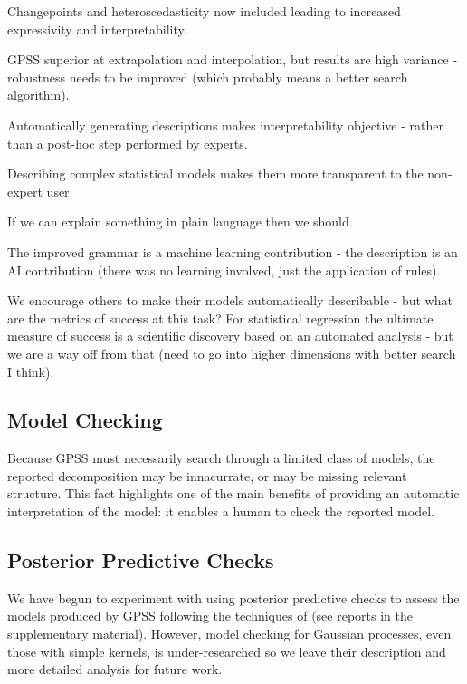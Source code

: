 \documentclass{article}
\begin{document}
Changepoints and heteroscedasticity now included leading to increased expressivity and interpretability.

GPSS superior at extrapolation and interpolation, but results are high variance - robustness needs to be improved (which probably means a better search algorithm).

Automatically generating descriptions makes interpretability objective - rather than a post-hoc step performed by experts.

Describing complex statistical models makes them more transparent to the non-expert user.

If we can explain something in plain language then we should.

The improved grammar is a machine learning contribution - the description is an AI contribution (there was no learning involved, just the application of rules).

We encourage others to make their models automatically describable - but what are the metrics of success at this task?
For statistical regression the ultimate measure of success is a scientific discovery based on an automated analysis - but we are a way off from that (need to go into higher dimensions with better search I think).

\subsection{Model Checking}

Because GPSS must necessarily search through a limited class of models, the reported decomposition may be innacurrate, or may be missing relevant structure.  This fact highlights one of the main benefits of providing an automatic interpretation of the model: it enables a human to check the reported model.

\subsection{Posterior Predictive Checks}

We have begun to experiment with using posterior predictive checks to assess the models produced by GPSS following the techniques of \cite{Gelman1996} (see reports in the supplementary material).
However, model checking for Gaussian processes, even those with simple kernels, is under-researched so we leave their description and more detailed analysis for future work.
\end{document}
